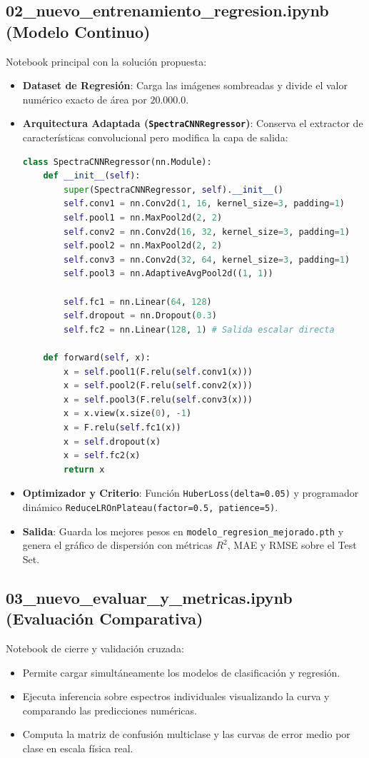 \documentclass[11pt,a4paper]{article}
\begin{document}
\subsection{02\_nuevo\_entrenamiento\_regresion.ipynb (Modelo Continuo)}
Notebook principal con la solución propuesta:
\begin{itemize}
    \item \textbf{Dataset de Regresión}: Carga las imágenes sombreadas y divide el valor numérico exacto de área por $20.000.0$.
    \item \textbf{Arquitectura Adaptada (\texttt{SpectraCNNRegressor})}: Conserva el extractor de características convolucional pero modifica la capa de salida:
    \begin{lstlisting}[language=Python]
class SpectraCNNRegressor(nn.Module):
    def __init__(self):
        super(SpectraCNNRegressor, self).__init__()
        self.conv1 = nn.Conv2d(1, 16, kernel_size=3, padding=1)
        self.pool1 = nn.MaxPool2d(2, 2)
        self.conv2 = nn.Conv2d(16, 32, kernel_size=3, padding=1)
        self.pool2 = nn.MaxPool2d(2, 2)
        self.conv3 = nn.Conv2d(32, 64, kernel_size=3, padding=1)
        self.pool3 = nn.AdaptiveAvgPool2d((1, 1))
        
        self.fc1 = nn.Linear(64, 128)
        self.dropout = nn.Dropout(0.3)
        self.fc2 = nn.Linear(128, 1) # Salida escalar directa

    def forward(self, x):
        x = self.pool1(F.relu(self.conv1(x)))
        x = self.pool2(F.relu(self.conv2(x)))
        x = self.pool3(F.relu(self.conv3(x)))
        x = x.view(x.size(0), -1)
        x = F.relu(self.fc1(x))
        x = self.dropout(x)
        x = self.fc2(x)
        return x
    \end{lstlisting}
    \item \textbf{Optimizador y Criterio}: Función \texttt{HuberLoss(delta=0.05)} y programador dinámico \texttt{ReduceLROnPlateau(factor=0.5, patience=5)}.
    \item \textbf{Salida}: Guarda los mejores pesos en \texttt{modelo\_regresion\_mejorado.pth} y genera el gráfico de dispersión con métricas $R^2$, MAE y RMSE sobre el Test Set.
\end{itemize}

\subsection{03\_nuevo\_evaluar\_y\_metricas.ipynb (Evaluación Comparativa)}
Notebook de cierre y validación cruzada:
\begin{itemize}
    \item Permite cargar simultáneamente los modelos de clasificación y regresión.
    \item Ejecuta inferencia sobre espectros individuales visualizando la curva y comparando las predicciones numéricas.
    \item Computa la matriz de confusión multiclase y las curvas de error medio por clase en escala física real.
\end{itemize}
\end{document}
